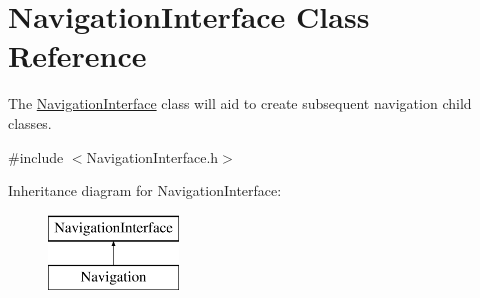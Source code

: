 \hypertarget{classNavigationInterface}{}\section{Navigation\+Interface Class Reference}
\label{classNavigationInterface}


The \hyperlink{classNavigationInterface}{Navigation\+Interface} class will aid to create subsequent navigation child classes.  




{\ttfamily \#include $<$Navigation\+Interface.\+h$>$}

Inheritance diagram for Navigation\+Interface\+:\begin{figure}[H]
\begin{center}
\leavevmode
\includegraphics[height=2.000000cm]{classNavigationInterface}
\end{center}
\end{figure}
